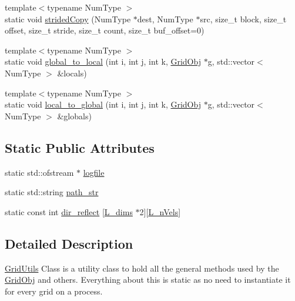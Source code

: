 \begin{DoxyCompactItemize}
\item 
{\footnotesize template$<$typename Num\+Type $>$ }\\static void \hyperlink{class_grid_utils_aa3ca6e20ef4fa927cb845956d7565b1e}{strided\+Copy} (Num\+Type $\ast$dest, Num\+Type $\ast$src, size\+\_\+t block, size\+\_\+t offset, size\+\_\+t stride, size\+\_\+t count, size\+\_\+t buf\+\_\+offset=0)
\item 
{\footnotesize template$<$typename Num\+Type $>$ }\\static void \hyperlink{class_grid_utils_a28cba8aa8cbe5dd20fa3405e2f46eeb2}{global\+\_\+to\+\_\+local} (int i, int j, int k, \hyperlink{class_grid_obj}{Grid\+Obj} $\ast$g, std\+::vector$<$ Num\+Type $>$ \&locals)
\item 
{\footnotesize template$<$typename Num\+Type $>$ }\\static void \hyperlink{class_grid_utils_ac3e122b19b2ee0e159b3025b2858d895}{local\+\_\+to\+\_\+global} (int i, int j, int k, \hyperlink{class_grid_obj}{Grid\+Obj} $\ast$g, std\+::vector$<$ Num\+Type $>$ \&globals)
\end{DoxyCompactItemize}
\subsection*{Static Public Attributes}
\begin{DoxyCompactItemize}
\item 
static std\+::ofstream $\ast$ \hyperlink{class_grid_utils_a298239096e929c1ba4eba925e351c1b3}{logfile}
\item 
static std\+::string \hyperlink{class_grid_utils_a9b58748e9e05e84852962d7abc7942e3}{path\+\_\+str}
\item 
static const int \hyperlink{class_grid_utils_a609ef43c9476067a52ee238cd3d594f2}{dir\+\_\+reflect} \mbox{[}\hyperlink{definitions_8h_a11cd469956bf6689c2bc034ee698e0b7}{L\+\_\+dims} $\ast$2\mbox{]}\mbox{[}\hyperlink{definitions_8h_a920e69a22e5f925675c5c77c521d586d}{L\+\_\+n\+Vels}\mbox{]}
\end{DoxyCompactItemize}


\subsection{Detailed Description}
\hyperlink{class_grid_utils}{Grid\+Utils} Class is a utility class to hold all the general methods used by the \hyperlink{class_grid_obj}{Grid\+Obj} and others. Everything about this is static as no need to instantiate it for every grid on a process. 

